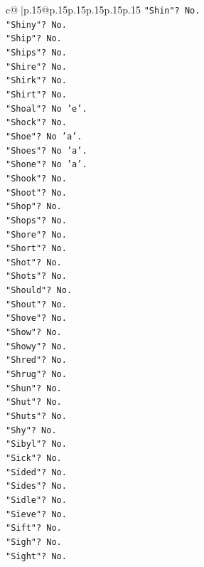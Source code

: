 \documentclass{article}
\begin{document}
{\begin{supertabular}{c@{$\;$}|p{.15\linewidth}@{}p{.15\linewidth}p{.15\linewidth}p{.15\linewidth}p{.15\linewidth}p{.15\linewidth}}
{{{\texttt{"Shin"? No.} \\
\texttt{"Shiny"? No.} \\
\texttt{"Ship"? No.} \\
\texttt{"Ships"? No.} \\
\texttt{"Shire"? No.} \\
\texttt{"Shirk"? No.} \\
\texttt{"Shirt"? No.} \\
\texttt{"Shoal"? No 'e'.} \\
\texttt{"Shock"? No.} \\
\texttt{"Shoe"? No 'a'.} \\
\texttt{"Shoes"? No 'a'.} \\
\texttt{"Shone"? No 'a'.} \\
\texttt{"Shook"? No.} \\
\texttt{"Shoot"? No.} \\
\texttt{"Shop"? No.} \\
\texttt{"Shops"? No.} \\
\texttt{"Shore"? No.} \\
\texttt{"Short"? No.} \\
\texttt{"Shot"? No.} \\
\texttt{"Shots"? No.} \\
\texttt{"Should"? No.} \\
\texttt{"Shout"? No.} \\
\texttt{"Shove"? No.} \\
\texttt{"Show"? No.} \\
\texttt{"Showy"? No.} \\
\texttt{"Shred"? No.} \\
\texttt{"Shrug"? No.} \\
\texttt{"Shun"? No.} \\
\texttt{"Shut"? No.} \\
\texttt{"Shuts"? No.} \\
\texttt{"Shy"? No.} \\
\texttt{"Sibyl"? No.} \\
\texttt{"Sick"? No.} \\
\texttt{"Sided"? No.} \\
\texttt{"Sides"? No.} \\
\texttt{"Sidle"? No.} \\
\texttt{"Sieve"? No.} \\
\texttt{"Sift"? No.} \\
\texttt{"Sigh"? No.} \\
\texttt{"Sight"? No.} \\
}}}
\end{supertabular}}
\end{document}
